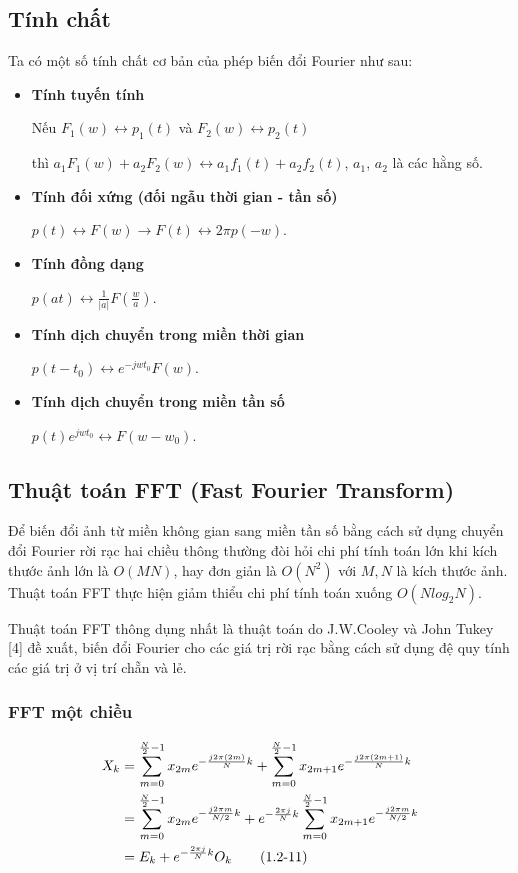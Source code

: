 \subsection{Tính chất}
Ta có một số tính chất cơ bản của phép biến đổi Fourier như sau:
\begin{itemize}
\item \textbf{Tính tuyến tính}
\par Nếu $F_1(w)\leftrightarrow p_1(t)$ và $F_2(w)\leftrightarrow p_2(t)$ \par thì $a_1 F_1(w) + a_2 F_2(w) \leftrightarrow a_1 f_1(t) + a_2 f_2(t) $, $a_1$, $a_2$ là các hằng số.


\item \textbf{Tính đối xứng (đối ngẫu thời gian - tần số)}
\par $p(t)\leftrightarrow F(w) \rightarrow F(t) \leftrightarrow 2\pi p(-w).$

\item \textbf{Tính đồng dạng}
\par $p(at)\leftrightarrow \frac{1}{|a|}F(\frac{w}{a}).$

\item \textbf{Tính dịch chuyển trong miền thời gian}
\par $p(t-t_0)\leftrightarrow {e^{ - jw{t_0}}}F(w).$

\item \textbf{Tính dịch chuyển trong miền tần số}
\par $p(t){e^{jw{t_0}}} \leftrightarrow F(w-w_0).$
\end{itemize}

\subsection{Thuật toán FFT (Fast Fourier Transform)}
Để biến đổi ảnh từ miền không gian sang miền tần số bằng cách sử dụng chuyển đổi Fourier rời rạc hai chiều thông thường đòi hỏi chi phí tính toán lớn khi kích thước ảnh lớn là $O(MN)$, hay đơn giản là $O(N^2)$ với $M,N$ là kích thước ảnh. Thuật toán FFT thực hiện giảm thiểu chi phí tính toán xuống $O(Nlog_2 N)$.
\par Thuật toán FFT thông dụng nhất là thuật toán do J.W.Cooley và John Tukey [4] đề xuất, biến đổi Fourier cho các giá trị rời rạc bằng cách sử dụng đệ quy tính các giá trị ở vị trí chẵn và lẻ. 
\subsubsection{FFT một chiều} 
\begin{align}
	{X_k} & = \sum\limits_{m = 0}^{\frac{N}{2}-1} {{x_{2m}}{e^{ - \frac{{j2\pi (2m)}}{N}k}}}  + \sum\limits_{m = 0}^{\frac{N}{2}-1} {{x_{2m + 1}}{e^{ - \frac{{j2\pi (2m + 1)}}{N}k}}} \notag \\
	& = \sum\limits_{m = 0}^{\frac{N}{2}-1} {{x_{2m}}{e^{ - \frac{{j2\pi m}}{{N/2}}k}}}  + {e^{ - \frac{{2\pi j}}{N}k}}\sum\limits_{m = 0}^{\frac{N}{2}-1} {{x_{2m + 1}}{e^{ - \frac{{j2\pi m}}{N/2}k}}} \notag \\
	& = E_k + {e^{ - \frac{{2\pi j}}{N}k}}O_k \tag{1.2-11}
\end{align}

